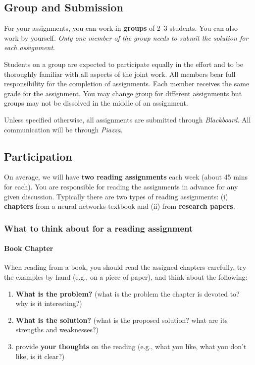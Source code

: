 \documentclass[11pt]{article}
\begin{document}
\subsection*{Group and Submission} 
For your assignments, you can work in \textbf{groups} of 2--3 students.  You can also work by yourself. \emph{Only one member of the group needs to submit the solution for each assignment}. 

Students on a group are expected to participate equally in the effort
    and to be thoroughly familiar with all aspects of the joint work.
    All members bear full responsibility for the completion of
    assignments. 
    Each member receives the same grade for the assignment.  You may change group for different assignments but groups may not be dissolved in the middle of an assignment.


Unless specified otherwise, all assignments are submitted through \emph{Blackboard}.  All communication will be through \emph{Piazza}.
\subsection{Participation}
\label{sec:org16c195f}

On average, we will have \textbf{\textbf{two reading assignments}} each week (about 45 mins for each). 
You are responsible for reading the assignments in advance for any given discussion.  Typically there are two types of reading assignments:  (i) \textbf{chapters} from a neural networks textbook and (ii) from \textbf{research papers}.  

\subsubsection{What to think about for a reading assignment}\label{sec:reading}
\paragraph{Book Chapter} When reading from a book, you should read the assigned chapters carefully, try the examples by hand (e.g., on a piece of paper), and think about the following:
\begin{enumerate}
    \item  \textbf{What is the problem?} (what is the problem the chapter is devoted to? why is it interesting?)
    \item \textbf{What is the solution?} (what is the proposed solution? what are its strengths and weaknesses?)
    \item  provide \textbf{your thoughts} on the reading (e.g., what you like, what you don't like, is it clear?)

\end{enumerate}    
\end{document}
